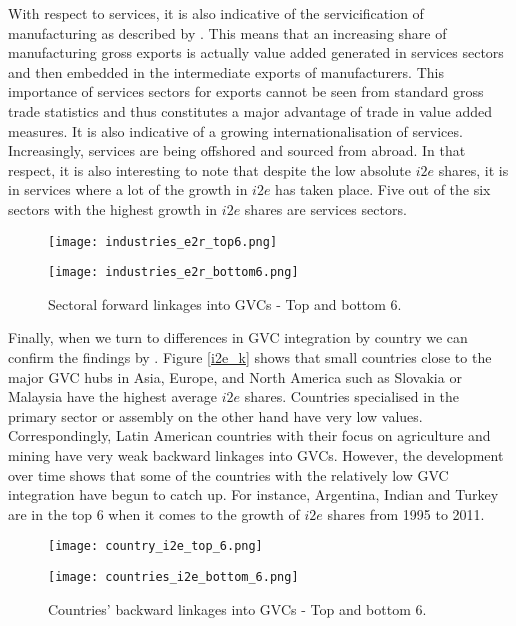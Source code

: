 \documentclass[11pt,a4paper]{article}
\begin{document}
With respect to services, it is also indicative of the servicification of manufacturing as described by \citet{ribaetal15}. This means that an increasing share of manufacturing gross exports is actually value added generated in services sectors and then embedded in the intermediate exports of manufacturers. This importance of services sectors for exports cannot be seen from standard gross trade statistics and thus constitutes a major advantage of trade in value added measures. It is also indicative of a growing internationalisation of services. Increasingly, services are being offshored and sourced from abroad. In that respect, it is also interesting to note that despite the low absolute $i2e$ shares, it is in services where a lot of the growth in $i2e$ has taken place. Five out of the six sectors with the highest growth in $i2e$ shares are services sectors.

\begin{figure}
\centering
\begin{minipage}{0.45\textwidth}
\centering
\texttt{[image: industries\_e2r\_top6.png]}
\end{minipage}\hfill
\begin{minipage}{0.45\textwidth}
\centering
\texttt{[image: industries\_e2r\_bottom6.png]}
\end{minipage}
\caption{Sectoral forward linkages into GVCs - Top and bottom 6.}
\label{fig:e2r_s}
\end{figure}

Finally, when we turn to differences in GVC integration by country we can confirm the findings by \citet{ribajalo13}. Figure \ref{i2e_k} shows that small countries close to the major GVC hubs in Asia, Europe, and North America such as Slovakia or Malaysia have the highest average $i2e$ shares. Countries specialised in the primary sector or assembly on the other hand have very low values. Correspondingly, Latin American countries with their focus on agriculture and mining have very weak backward linkages into GVCs. However, the development over time shows that some of the countries with the relatively low GVC integration have begun to catch up. For instance, Argentina, Indian and Turkey are in the top 6 when it comes to the growth of $i2e$ shares from 1995 to 2011.

\begin{figure}
\centering
\begin{minipage}{0.45\textwidth}
\centering
\texttt{[image: country\_i2e\_top\_6.png]}
\end{minipage}\hfill
\begin{minipage}{0.45\textwidth}
\centering
\texttt{[image: countries\_i2e\_bottom\_6.png]}
\end{minipage}
\caption{Countries' backward linkages into GVCs - Top and bottom 6.}
\label{fig:i2e_k}
\end{figure}
\end{document}
